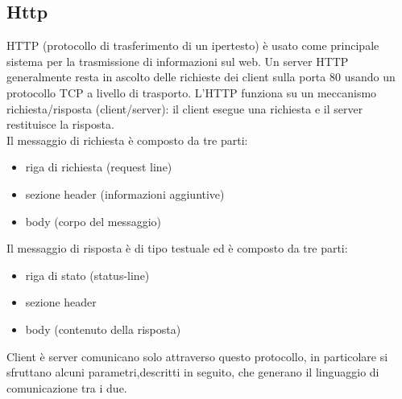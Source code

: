 \documentclass[12pt,a4]{article}
\begin{document}
\subsection{Http}
HTTP (protocollo di trasferimento di un ipertesto) è usato come principale sistema per la trasmissione di informazioni sul web. Un server HTTP generalmente resta in ascolto delle richieste dei client sulla porta 80 usando un protocollo
TCP a livello di trasporto. L'HTTP funziona su un meccanismo richiesta/risposta (client/server): il client esegue una richiesta e il server restituisce la risposta.\\
Il messaggio di richiesta è composto da tre parti:
\begin{itemize}
\item riga di richiesta (request line)
\item sezione header (informazioni aggiuntive)
\item body (corpo del messaggio)
\end{itemize}
Il messaggio di risposta è di tipo testuale ed è composto da tre parti:
\begin{itemize}
\item riga di stato (status-line)
\item sezione header
\item body (contenuto della risposta)
\end{itemize}
Client è server comunicano solo attraverso questo protocollo, in particolare si sfruttano alcuni parametri,descritti in seguito, che generano il linguaggio di comunicazione tra i due. 
\end{document}
